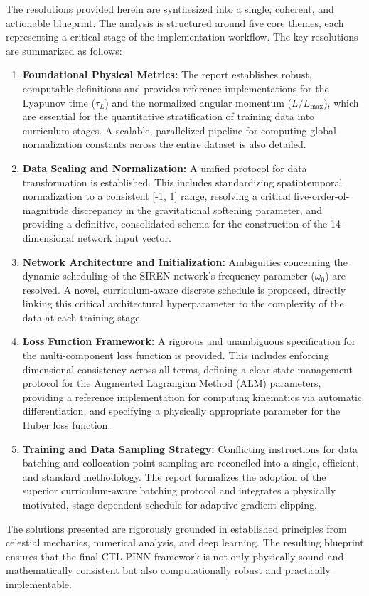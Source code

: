 \documentclass[11pt, a4paper]{article}
\begin{document}
The resolutions provided herein are synthesized into a single, coherent, and actionable blueprint. The analysis is structured around five core themes, each representing a critical stage of the implementation workflow. The key resolutions are summarized as follows:
\begin{enumerate}
    \item \textbf{Foundational Physical Metrics:} The report establishes robust, computable definitions and provides reference implementations for the Lyapunov time ($\tau_L$) and the normalized angular momentum ($L/L_{\max}$), which are essential for the quantitative stratification of training data into curriculum stages. A scalable, parallelized pipeline for computing global normalization constants across the entire dataset is also detailed.
    \item \textbf{Data Scaling and Normalization:} A unified protocol for data transformation is established. This includes standardizing spatiotemporal normalization to a consistent [-1, 1] range, resolving a critical five-order-of-magnitude discrepancy in the gravitational softening parameter, and providing a definitive, consolidated schema for the construction of the 14-dimensional network input vector.
    \item \textbf{Network Architecture and Initialization:} Ambiguities con\-cerning the dynamic scheduling of the SIREN network's frequency parameter ($\omega_0$) are resolved. A novel, curriculum-aware discrete schedule is proposed, directly linking this critical architectural hyperparameter to the complexity of the data at each training stage.
    \item \textbf{Loss Function Framework:} A rigorous and unambiguous specification for the multi-component loss function is provided. This includes enforcing dimensional consistency across all terms, defining a clear state management protocol for the Augmented Lagrangian Method (ALM) parameters, providing a reference implementation for computing kinematics via automatic differentiation, and specifying a physically appropriate parameter for the Huber loss function.
    \item \textbf{Training and Data Sampling Strategy:} Conflicting instructions for data batching and collocation point sampling are reconciled into a single, efficient, and standard methodology. The report formalizes the adoption of the superior curriculum-aware batching protocol and integrates a physically motivated, stage-dependent schedule for adaptive gradient clipping.
\end{enumerate}
The solutions presented are rigorously grounded in established principles from celestial mechanics, numerical analysis, and deep learning. The resulting blueprint ensures that the final CTL-PINN framework is not only physically sound and mathematically consistent but also computationally robust and practically implementable.
\end{document}
